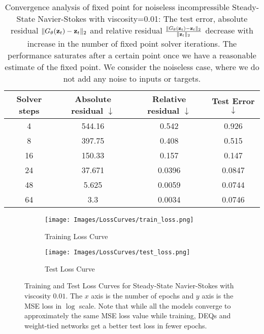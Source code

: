 \begin{table}[th!]
    \centering
    \begin{tabular}{cccc}
    \toprule
    Solver steps & Absolute residual $\downarrow$  & Relative residual $\downarrow$ & Test Error $\downarrow$ \\
    \midrule
    4 & 544.16 & 0.542 & 0.926 \\
    8 & 397.75 & 0.408 & 0.515 \\
    16 & 150.33 & 0.157 & 0.147 \\
    24 & 37.671 & 0.0396 & 0.0847 \\
    48 & 5.625 & 0.0059 & 0.0744 \\
    64 & 3.3 & 0.0034 & 0.0746 \\
    \bottomrule
    \end{tabular}
    \caption{Convergence analysis of fixed point for noiseless incompressible Steady-State Navier-Stokes with viscosity=0.01: The test error, absolute residual $\| G_\theta({\mathbf{z}}_t) - {\mathbf{z}}_t\|_2$ and relative residual $\frac{\| G_\theta({\mathbf{z}}_t) - {\mathbf{z}}_t\|_2}{\| {\mathbf{z}}_t \|_2}$ decrease with increase in the number of fixed point solver iterations. The performance saturates after a certain point once we have a reasonable estimate of the fixed point. We consider the noiseless case, where we do not add any noise to inputs or targets.}
    \label{tab:ns_0.01_convergence}
\end{table}

\begin{figure}[!t]
    \centering
    \begin{subfigure}[b]{0.7\textwidth}
        \centering
        \texttt{[image: Images/LossCurves/train\_loss.png]}
        \caption{Training Loss Curve}
    \end{subfigure}
    \hfill
    \begin{subfigure}[b]{0.7\textwidth}
        \centering
        \texttt{[image: Images/LossCurves/test\_loss.png]}
        \caption{Test Loss Curve}
        \end{subfigure}
    \caption{Training and Test Loss Curves for Steady-State Navier-Stokes with viscosity $0.01$. The $x$ axis is the number of epochs and $y$ axis is the MSE loss in $\log$ scale. 
    Note that while all the models converge to approximately the same MSE loss value while training, DEQs and weight-tied networks get a better test loss in fewer epochs.
    }
    \label{fig:train_val_error}
\end{figure}



